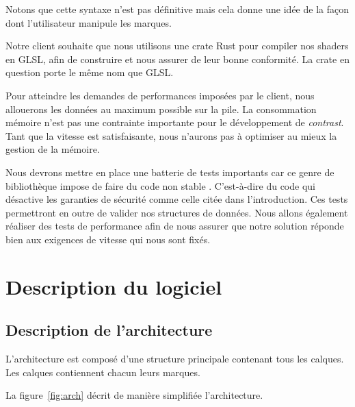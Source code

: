 \documentclass[12pt]{article}
\begin{document}

Notons que cette syntaxe n'est pas définitive mais cela donne une idée de la façon
dont l'utilisateur manipule les marques.

Notre client souhaite que nous utilisons une crate Rust pour compiler
nos shaders en GLSL, afin de construire et nous assurer de leur bonne conformité.
La crate en question porte le même nom que GLSL\cite{GLSL}.

Pour atteindre les demandes de performances imposées par le client, nous allouerons les données au maximum possible sur la pile.
La consommation mémoire n'est pas une contrainte importante pour le développement de \textit{contrast}. Tant
que la vitesse est satisfaisante, nous n'aurons pas à optimiser au mieux la gestion de la mémoire.

Nous devrons mettre en place une batterie de tests importants car ce genre de bibliothèque impose de faire
du code \og non stable \fg{}.
C'est-à-dire du code qui désactive les garanties de sécurité comme celle citée dans l'introduction.
Ces tests permettront en outre de valider nos structures de données.
Nous allons également réaliser des tests de performance afin de nous assurer que notre solution réponde bien
aux exigences de vitesse qui nous sont fixés.

\section{Description du logiciel}
\subsection{Description de l'architecture}

L'architecture est composé d'une structure principale contenant tous les calques. Les calques contiennent
chacun leurs marques.

La figure~\ref{fig:arch} décrit de manière simplifiée l'architecture.
\end{document}

